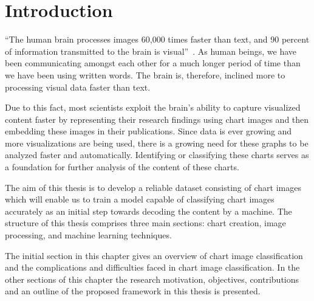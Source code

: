 \documentclass[12pt, a4paper,oneside]{report}
\begin{document}

\setcounter{tocdepth}{10}

\clearpage
\tableofcontents





\listoffigures
\listoftables

\titleformat{\chapter}{\LARGE\bfseries}{\thechapter}{1em}{}

\newpage


\newpage
\chapter{Introduction}
``The human brain processes images 60,000 times faster than text, and 90 percent of information transmitted to the brain is visual''~\cite{humaneye}. As human beings, we have been communicating amongst each other for a much longer period of time than we have been using written words. The brain is, therefore, inclined more to processing visual data faster than text.

Due to this fact, most scientists exploit the brain's ability to capture visualized content faster by representing their research findings using chart images and then embedding these images in their publications. Since data is ever growing and more visualizations are being used, there is a growing need for these graphs to be analyzed faster and automatically. Identifying or classifying these charts serves as a foundation for further analysis of the content of these charts.  

The aim of this thesis is to develop a reliable dataset consisting of chart images which will enable us to train a model capable of classifying chart images accurately as an initial step towards decoding the content by a machine. The structure of this thesis comprises three main sections: chart creation, image processing, and machine learning techniques.

The initial section in this chapter gives an overview of chart image classification and the complications and difficulties faced in chart image classification. In the other sections of this chapter the research motivation, objectives, contributions and an outline of the proposed framework in this thesis is presented.
\end{document}
